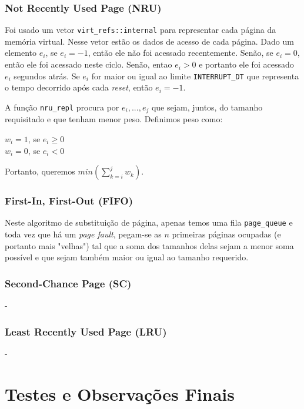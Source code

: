 \documentclass{beamer}
\begin{document}

\begin{frame}
  \frametitle{Not Recently Used Page (NRU)}
  Foi usado um vetor \texttt{virt\_refs::internal} para representar cada página da memória virtual.
  Nesse vetor estão os dados de acesso de cada página. Dado um elemento $e_i$, se $e_i=-1$, então
  ele não foi acessado recentemente. Senão, se $e_i=0$, então ele foi acessado neste ciclo. Senão,
  entao $e_i>0$ e portanto ele foi acessado $e_i$ segundos atrás. Se $e_i$ for maior ou igual ao
  limite \texttt{INTERRUPT\_DT} que representa o tempo decorrido após cada \textit{reset}, então
  $e_i=-1$.

  A função \texttt{nru\_repl} procura por $e_i,...,e_j$ que sejam, juntos, do tamanho requisitado e
  que tenham menor peso. Definimos peso como:

  $w_i = 1$, se $e_i \geq 0$ \\
  $w_i = 0$, se $e_i < 0$

  Portanto, queremos $min(\sum_{k=i}^j w_k)$.
\end{frame}


\begin{frame}
  \frametitle{First-In, First-Out (FIFO)}
  Neste algoritmo de substituição de página, apenas temos uma fila \texttt{page\_queue} e toda vez
  que há um \textit{page fault}, pegam-se as $n$ primeiras páginas ocupadas (e portanto mais
  "velhas") tal que a soma dos tamanhos delas sejam a menor soma possível e que sejam também maior
  ou igual ao tamanho requerido.
\end{frame}


\begin{frame}
\frametitle{Second-Chance Page (SC)}
-
\end{frame}


\begin{frame}
\frametitle{Least Recently Used Page (LRU)}
-
\end{frame}

\section{Testes e Observações Finais}
\end{document}
